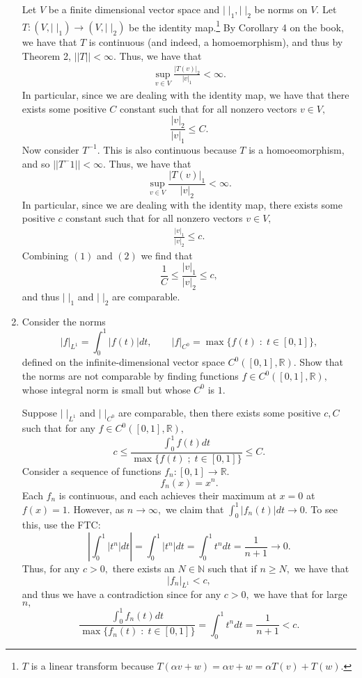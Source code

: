 \documentclass[11pt]{article}
\newcommand{\bbN}{\mathbb{N}}
\newcommand{\bbR}{\mathbb{R}}
\begin{document}
\begin{enumerate}
\begin{problem}
    \end{problem}
    \begin{solution}
        Let $V$ be a finite dimensional vector space and $|\;|_1, |\;|_2$ be norms on $V$. Let $T: (V, |\;|_1) \to (V, |\;|_2)$ be the identity map.\footnote{$T$ is a linear transform because $T(\alpha v + w) = \alpha v + w = \alpha T(v) + T(w)$.} By Corollary 4 on the book, we have that $T$ is continuous (and indeed, a homoemorphism), and thus by Theorem 2, $||T||< \infty.$ Thus, we have that 
        \begin{align}
        \sup_{v \in V}\frac{|T(v)|_2}{|v|_1} < \infty. 
        \end{align}
        In particular, since we are dealing with the identity map, we have that there exists some positive $C$ constant such that for all nonzero vectors $v \in V,$ 
        \[\frac{|v|_2}{|v|_1}\leq C.\] Now consider $T^{-1}.$ This is also continuous because $T$ is a homoeomorphism, and so $||T^-1||< \infty.$ Thus, we have that 
        \[\sup_{v\in V}\frac{|T(v)|_1}{|v|_2}< \infty.\] In particular, since we are dealing with the identity map, there exists some positive $c$ constant such that for all nonzero vectors $v \in V,$
        \begin{align}
        \frac{|v|_1}{|v|_2}\leq c.    
        \end{align}
        Combining $(1)$ and $(2)$ we find that 
        \[\frac{1}{C}\leq \frac{|v|_1}{|v|_2}\leq c,\] and thus $|\;|_1$ and $|\;|_2$ are comparable.
    \end{solution}
    \item  
    \begin{problem}
        Consider the norms 
        \[|f|_{L^1} = \int_0^1 |f(t)|dt, \qquad |f|_{C^0} = \max\{f(t)\;: \; t\in[0,1]\},\] defined on the infinite-dimensional vector space $C^0([0,1], \bbR).$ Show that the norms are not comparable by finding functions $f \in C^0([0,1], \bbR),$ whose integral norm is small but whose $C^0$ is $1.$
    \end{problem}
    \begin{solution}
    Suppose $|\;|_{L^1}$ and $|\;|_{C^0}$ are comparable, then there exists some positive $c, C$ such that for any $f \in C^0([0,1], \bbR),$
    \[c \leq \frac{\int_0^1 f(t)dt}{\max\{f(t)\; ; \; t\in [0,1]\}}\leq C.\]
        Consider a sequence of functions $f_n: [0,1]\to \bbR.$
        \[f_n(x)= x^n.\] Each $f_n$ is continuous, and each achieves their maximum at $x = 0$ at $f(x) = 1.$ However, as $n\to \infty,$ we claim that $\int_0^1|f_n(t)|dt \to 0.$ To see this, use the FTC:
        \[\left|\int_0^1|t^n|dt\right| = \int_0^1|t^n|dt = \int_0^1 t^ndt = \frac{1}{n+1}\to 0.\] Thus, for any $c>0,$ there exists an $N\in \bbN$ such that if $n\geq N,$  we have that 
        \[|f_n|_{L^1}< c,\] and thus we have a contradiction since for any $c>0,$ we have that for large $n,$
        \[\frac{\int_0^1 f_n(t)dt}{\max\{f_n(t)\;:\;t\in [0,1]\}} = \int_0^1 t^n dt = \frac{1}{n+1} < c.\]
    \end{solution}
\end{enumerate}
\end{document}
